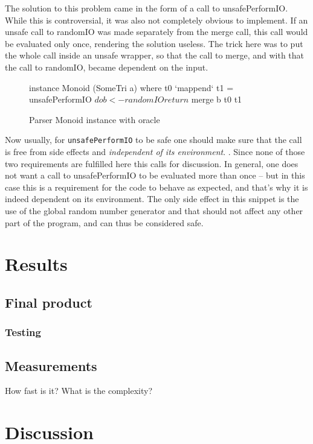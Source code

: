 \documentclass[a4paper,12pt,twosided]{report}
\begin{document}
The solution to this problem came in the form of a call to unsafePerformIO.
While this is controversial, it was also not completely obvious to implement. If
an unsafe call to randomIO was made separately from the merge call, this call
would be evaluated only once, rendering the solution useless. The trick here was
to put the whole call inside an unsafe wrapper, so that the call to merge, and
with that the call to randomIO, became dependent on the input.
\begin{figure}[H]
\begin{code}
instance Monoid (SomeTri a) where
    t0 `mappend` t1 = unsafePerformIO $ do
      b <- randomIO
      return $ merge b t0 t1
\end{code}
\caption{Parser Monoid instance with oracle}
\end{figure}
Now usually, for \texttt{unsafePerformIO} to be safe one should make sure that
the call is free from side effects and \textit{independent of its environment}.
\cite{unsafeHackage}. Since none of those two requirements are fulfilled here
this calls for discussion. In general, one does not want a call to
unsafePerformIO to be evaluated more than once -- but in this case this is a
requirement for the code to behave as expected, and that's why it is indeed
dependent on its environment. The only side effect in this snippet is the use of
the global random number generator and that should not affect any other part of
the program, and can thus be considered safe.

%
%

\chapter{Results}

\section{Final product}
\subsection{Testing}

\section{Measurements}
How fast is it? What is the complexity?

%
%
\chapter{Discussion}
\end{document}
